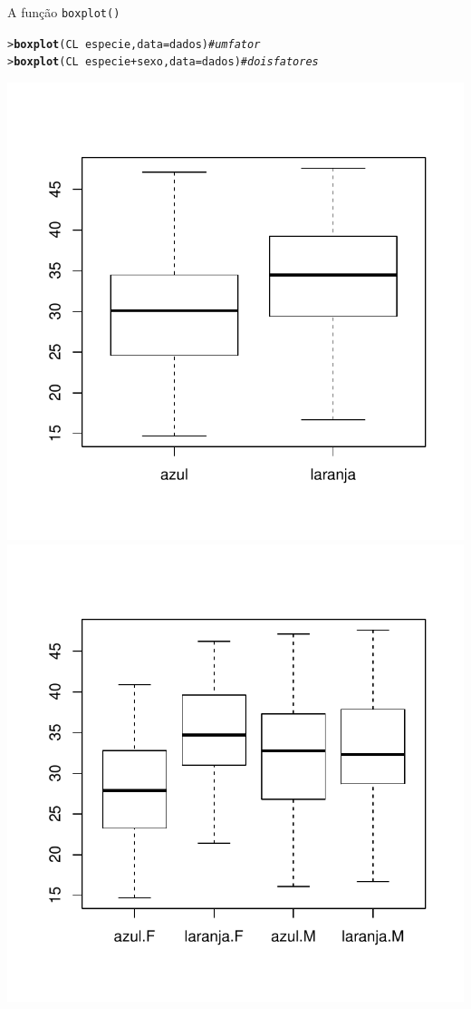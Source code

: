 \documentclass[10pt]{beamer}\usepackage[]{graphicx}\usepackage[]{color}
\makeatletter
\newcommand{\hlcom}[1]{\textcolor[rgb]{0.498,0.498,0.498}{\textit{#1}}}%
\newcommand{\hlopt}[1]{\textcolor[rgb]{0,0,0}{#1}}%
\newcommand{\hlstd}[1]{\textcolor[rgb]{0.345,0.345,0.345}{#1}}%
\newcommand{\hlkwc}[1]{\textcolor[rgb]{0.333,0.667,0.333}{#1}}%
\newcommand{\hlkwd}[1]{\textcolor[rgb]{0.282,0.239,0.545}{\textbf{#1}}}%
\newenvironment{kframe}{%
 \def\at@end@of@kframe{}%
 \ifinner\ifhmode%
  \def\at@end@of@kframe{\end{minipage}}%
  \begin{minipage}{\columnwidth}%
 \fi\fi%
 \def\FrameCommand##1{\hskip\@totalleftmargin \hskip-\fboxsep
 \colorbox{shadecolor}{##1}\hskip-\fboxsep
     \hskip-\linewidth \hskip-\@totalleftmargin \hskip\columnwidth}%
 \MakeFramed {\advance\hsize-\width
   \@totalleftmargin\z@ \linewidth\hsize
   \@setminipage}}%
 {\par\unskip\endMakeFramed%
 \at@end@of@kframe}
\newenvironment{knitrout}{}{} %
\makeatother
\begin{document}
\begin{frame}[fragile=singleslide]{A função \texttt{boxplot()}}
\begin{knitrout}\small
{}\color{fgcolor}\begin{kframe}
\begin{alltt}
\hlstd{> }\hlkwd{boxplot}\hlstd{(CL} \hlopt{~} \hlstd{especie,} \hlkwc{data} \hlstd{= dados)}        \hlcom{# um fator}
\hlstd{> }\hlkwd{boxplot}\hlstd{(CL} \hlopt{~} \hlstd{especie} \hlopt{+} \hlstd{sexo,} \hlkwc{data} \hlstd{= dados)} \hlcom{# dois fatores}
\end{alltt}
\end{kframe}

{\centering \includegraphics[width=.49\textwidth]{figure/unnamed-chunk-301} 
\includegraphics[width=.49\textwidth]{figure/unnamed-chunk-302} 

}



\end{knitrout}

\end{frame}
\end{document}

